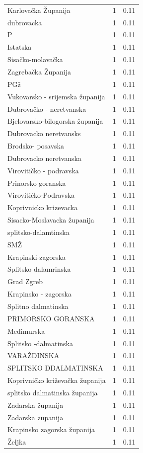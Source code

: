 \begin{tabular}{lrr}
Karlovačka Županija & 1 & 0.11 \\
dubrovacka & 1 & 0.11 \\
P & 1 & 0.11 \\
Istatska & 1 & 0.11 \\
Sisačko-molavačka & 1 & 0.11 \\
Zagrebačka Županija & 1 & 0.11 \\
PGž & 1 & 0.11 \\
Vukovarsko - srijemska županija & 1 & 0.11 \\
Dubrovačko - neretvanska & 1 & 0.11 \\
Bjelovarsko-bilogorska županija & 1 & 0.11 \\
Dubrovacko neretvansks & 1 & 0.11 \\
Brodsko- posavska & 1 & 0.11 \\
Dubrovacko neretvanska & 1 & 0.11 \\
Virovitičko - podravska & 1 & 0.11 \\
Prinorsko goranska & 1 & 0.11 \\
Virovitičko-Podravska & 1 & 0.11 \\
Koprivnicko krizevacka & 1 & 0.11 \\
Sisacko-Moslavacka županija & 1 & 0.11 \\
splitsko-dalamtinska & 1 & 0.11 \\
SMŽ & 1 & 0.11 \\
Krapinski-zagorska & 1 & 0.11 \\
Splitsko dalamrinska & 1 & 0.11 \\
Grad Zgreb & 1 & 0.11 \\
Krapinsko - zagorska & 1 & 0.11 \\
Splitno dalmatinska & 1 & 0.11 \\
PRIMORSKO GORANSKA & 1 & 0.11 \\
Medimurska & 1 & 0.11 \\
Splitsko -dalmatinska & 1 & 0.11 \\
VARAŽDINSKA & 1 & 0.11 \\
SPLITSKO DDALMATINSKA & 1 & 0.11 \\
Koprivničko križevačka županija & 1 & 0.11 \\
splitsko dalmatinska županija & 1 & 0.11 \\
Zadarska županija & 1 & 0.11 \\
Zadarska zupanija & 1 & 0.11 \\
Krapinsko zagorska županija & 1 & 0.11 \\
Željka & 1 & 0.11 \\

\end{tabular}
